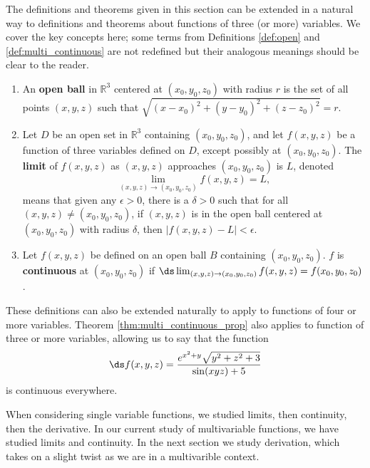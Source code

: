The definitions and theorems given in this section can be extended in a natural way to definitions and theorems about functions of three (or more) variables. We cover the key concepts here; some terms from Definitions \ref{def:open} and \ref{def:multi_continuous} are not redefined but their analogous meanings should be clear to the reader.

\setboxwidth{20pt}
{ 
\begin{enumerate}
\item An \textbf{open ball} in $\mathbb{R}^3$ centered at $(x_0,y_0,z_0)$ with radius $r$ is the set of all points $(x,y,z)$ such that $\sqrt{(x-x_0)^2+(y-y_0)^2+(z-z_0)^2} = r$.
\\

\item Let $D$ be an open set in $\mathbb{R}^3$ containing $(x_0,y_0,z_0)$, and let $f(x,y,z)$ be a function of three variables defined on $D$, except possibly at  $(x_0,y_0,z_0)$. The \textbf{limit} of $f(x,y,z)$ as $(x,y,z)$ approaches $(x_0,y_0,z_0)$ is $L$, denoted 
$$\lim_{(x,y,z)\to (x_0,y_0,z_0)} f(x,y,z) = L,$$
means that given any $\epsilon >0$, there is a $\delta >0$ such that for all  $(x,y,z)\neq(x_0,y_0,z_0)$, if $(x,y,z)$ is in the open ball centered at $(x_0,y_0,z_0)$ with radius $\delta$, then $|f(x,y,z) - L|< \epsilon$.\\

\item Let $f(x,y,z)$ be defined on an open ball $B$ containing $(x_0,y_0,z_0)$. $f$ is \textbf{continuous} at $(x_0,y_0,z_0)$ if $\ds \lim_{(x,y,z)\to (x_0,y_0,z_0)} f(x,y,z) = f(x_0,y_0,z_0)$.
\end{enumerate}
}
\restoreboxwidth

These definitions can also be extended naturally to apply to functions of four or more variables. Theorem \ref{thm:multi_continuous_prop} also applies to function of three or more variables, allowing us to say that the function $$\ds f(x,y,z) = \frac{e^{x^2+y}\sqrt{y^2+z^2+3}}{\sin (xyz)+5}$$ is continuous everywhere.

When considering single variable functions, we studied limits, then continuity, then the derivative. In our current study of multivariable functions, we have studied limits and continuity. In the next section we study derivation, which takes on a slight twist as we are in a multivarible context.

